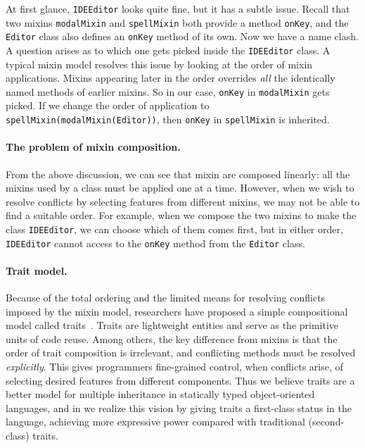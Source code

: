 At first glance, \lstinline{IDEEditor} looks quite fine, but it has a subtle
issue. Recall that two mixins \lstinline{modalMixin} and \lstinline{spellMixin}
both provide a method \lstinline{onKey}, and the \lstinline{Editor} class also
defines an \lstinline{onKey} method of its own. Now we have a name clash. A
question arises as to which one gets picked inside the \lstinline{IDEEditor}
class. A typical mixin model resolves this issue by looking at the order of mixin applications. Mixins appearing later in the order
overrides \emph{all} the identically named methods of earlier mixins. So in our
case, \lstinline{onKey} in \lstinline{modalMixin} gets picked. If we
change the order of application to \lstinline{spellMixin(modalMixin(Editor))},
then \lstinline{onKey} in \lstinline{spellMixin} is inherited.

\paragraph{The problem of mixin composition.}
From the above discussion, we can see that mixin are composed linearly: all the
mixins used by a class must be applied one at a time. However, when we wish to
resolve conflicts by selecting features from different mixins, we may not be
able to find a suitable order. For example, when we compose the two mixins to
make the class \lstinline{IDEEditor}, we can choose which of them comes first,
but in either order, \lstinline{IDEEditor} cannot access to the \lstinline{onKey}
method from the \lstinline{Editor} class.

\paragraph{Trait model.}
Because of the total ordering and the limited means for resolving conflicts imposed by the mixin model,
researchers have proposed a simple compositional model called
traits~\citep{scharli2003traits, Ducasse_2006}. Traits are lightweight entities and serve as
the primitive units of code reuse. Among others, the key difference from
mixins is that the order of trait composition is irrelevant, and conflicting
methods must be resolved \emph{explicitly}. This gives programmers
fine-grained control, when conflicts arise, of selecting desired features from
different components. Thus we believe traits are a better model for multiple
inheritance in statically typed object-oriented languages, and in \sedel we realize this
vision by giving traits a first-class status in the language,
achieving more expressive power compared with traditional (second-class) traits.



